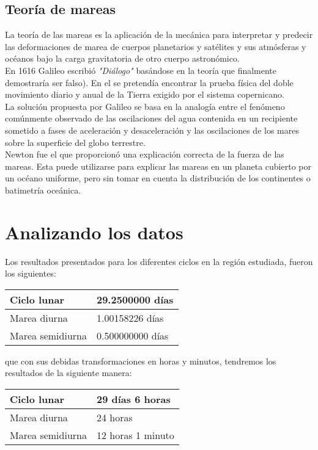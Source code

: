 \documentclass[a4paper]{article}
\begin{document}
\subsection{Teoría de mareas}
La teoría de las mareas es la aplicación de la mecánica para interpretar y predecir las deformaciones de marea de cuerpos planetarios y satélites y sus atmósferas y océanos bajo la carga gravitatoria de otro cuerpo astronómico. \\

En 1616 Galileo escribió \textit{"Diálogo"} basándose en la teoría que finalmente demostraría ser falso). En el se pretendía encontrar la prueba física del doble movimiento diario y anual de la Tierra exigido por el sistema copernicano. \\

La solución propuesta por Galileo se basa en la analogía entre el fenómeno comúnmente observado de las oscilaciones del agua contenida en un recipiente sometido a fases de aceleración y desaceleración y las oscilaciones de los mares sobre la superficie del globo terrestre. \\

Newton fue el que proporcionó una explicación correcta de la fuerza de las mareas. Esta puede utilizarse para explicar las mareas en un planeta cubierto por un océano uniforme, pero sin tomar en cuenta la distribución de los continentes o batimetría oceánica.

\section{Analizando los datos}
Los resultados presentados para los diferentes ciclos en la región estudiada, fueron los siguientes:
\begin{table}[h!]
  \centering
  \begin{tabular}{|p{3cm}|p{3cm}|}
  \hline
 Ciclo lunar&29.2500000 días\\ \hline
 Marea diurna&1.00158226 días \\ \hline
 Marea semidiurna&0.500000000 días \\ \hline
   \end{tabular}
  \end{table} 

que con sus debidas transformaciones en horas y minutos, tendremos los resultados de la siguiente manera:
\begin{table}[h!]
  \centering
  \begin{tabular}{|p{3cm}|p{3cm}|}
  \hline
 Ciclo lunar&29 días 6 horas \\ \hline
 Marea diurna&24 horas \\ \hline
 Marea semidiurna&12 horas 1 minuto \\ \hline
   \end{tabular}
  \end{table} 
\end{document}
